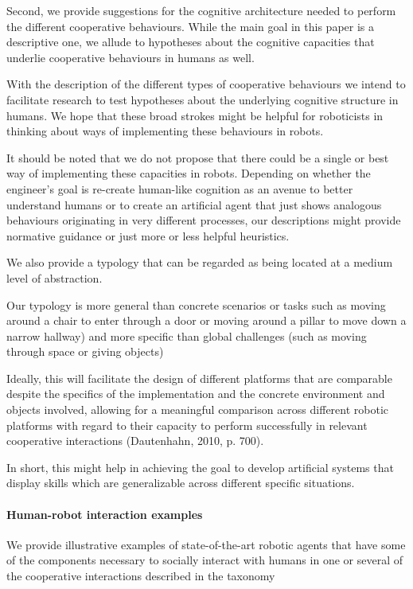 \documentclass{article}
\begin{document}
Second, we provide suggestions for the cognitive architecture needed to perform
the different cooperative behaviours. While the main goal in this paper is a
descriptive one, we allude to hypotheses about the cognitive capacities that
underlie cooperative behaviours in humans as well. 

With the description of the different types of cooperative behaviours we intend
to facilitate research to test hypotheses about the underlying cognitive
structure in humans. We hope that these
broad strokes might be helpful for roboticists in thinking about ways of
implementing these behaviours in robots.

It should be noted that we do not propose that there could be a
single or best way of implementing these capacities in robots. Depending on
whether the engineer's goal is re-create human-like cognition as an
avenue to better understand humans or to create an artificial agent that
just shows analogous behaviours originating in very different processes, our
descriptions might provide normative guidance or just more or less helpful
heuristics.

We also provide a typology that can be regarded as being located at a
medium level of abstraction. 

Our typology is more general than concrete scenarios or tasks
such as moving around a chair to enter through a door or moving around
a pillar to move down a narrow hallway) and more specific than global
challenges (such as moving through space or giving objects)

Ideally, this will facilitate the design of different platforms
that are comparable despite the specifics of the implementation and the
concrete environment and objects involved, allowing for a meaningful
comparison across different robotic platforms with regard to their
capacity to perform successfully in relevant cooperative interactions
(Dautenhahn, 2010, p. 700).

In short, this might help in achieving the goal to develop
artificial systems that display skills which are generalizable across
different specific situations.

\paragraph{Human-robot interaction examples} We provide illustrative examples
of state-of-the-art robotic agents that have some of the components necessary
to socially interact with humans in one or several of the cooperative
interactions described in the taxonomy
\end{document}
